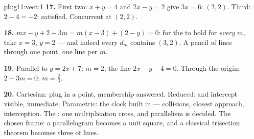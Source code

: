 \begin{solution}{pb:g11:vect:1}
\textbf{17.} First two: $x + y = 4$ and $2x - y = 2$ give
$3x = 6$: $(2, 2)$. Third: $2 - 4 = -2$: satisfied. Concurrent
at $(2, 2)$.

\textbf{18.} $mx - y + 2 - 3m = m(x - 3) + (2 - y) = 0$: for
the  to hold for \emph{every} $m$, take $x = 3$,
$y = 2$ --- and indeed every $d_m$ contains $(3, 2)$. A pencil
of lines through one point, one line per  $m$.

\textbf{19.} Parallel to $y = 2x + 7$:  $m = 2$, the line
$2x - y - 4 = 0$. Through the origin: $2 - 3m = 0$:
$m = \frac23$.

\textbf{20.} Cartesian: plug in a point, membership answered.
Reduced:  and intercept visible,  immediate.
Parametric: the clock built in --- collisions, closest
approach, interception. The : one multiplication
cross, and parallelism is decided. The chosen frame: a
parallelogram becomes a unit square, and a classical trisection
theorem becomes three  of lines.
\end{solution}
